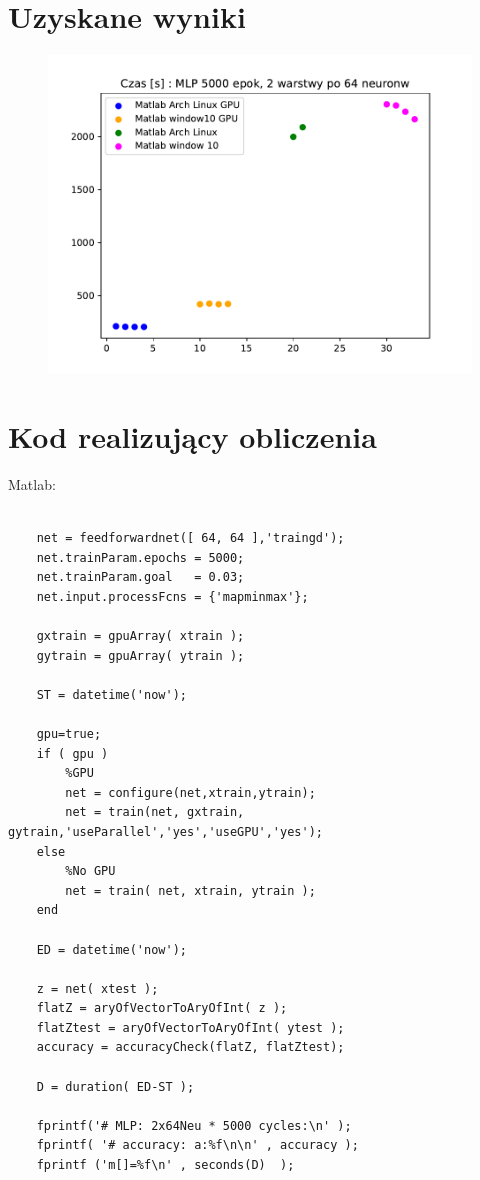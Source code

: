 \section{Uzyskane wyniki}
\begin{figure}[h]
    	\centering 
            \includegraphics[width=0.88\linewidth]{gfx/fig03.pdf} 
\end{figure} 


\newpage
\section{Kod realizujący obliczenia}

Matlab:
\begin{lstlisting}

    net = feedforwardnet([ 64, 64 ],'traingd'); 
    net.trainParam.epochs = 5000;
    net.trainParam.goal   = 0.03;
    net.input.processFcns = {'mapminmax'};  

    gxtrain = gpuArray( xtrain );
    gytrain = gpuArray( ytrain );

    ST = datetime('now');

    gpu=true;
    if ( gpu )
        %GPU
        net = configure(net,xtrain,ytrain);
        net = train(net, gxtrain, gytrain,'useParallel','yes','useGPU','yes');
    else
        %No GPU
        net = train( net, xtrain, ytrain );
    end    
    
    ED = datetime('now');

    z = net( xtest );
    flatZ = aryOfVectorToAryOfInt( z );
    flatZtest = aryOfVectorToAryOfInt( ytest ); 
    accuracy = accuracyCheck(flatZ, flatZtest);

    D = duration( ED-ST );

    fprintf('# MLP: 2x64Neu * 5000 cycles:\n' );
    fprintf( '# accuracy: a:%f\n\n' , accuracy );
    fprintf ('m[]=%f\n' , seconds(D)  );

\end{lstlisting}


